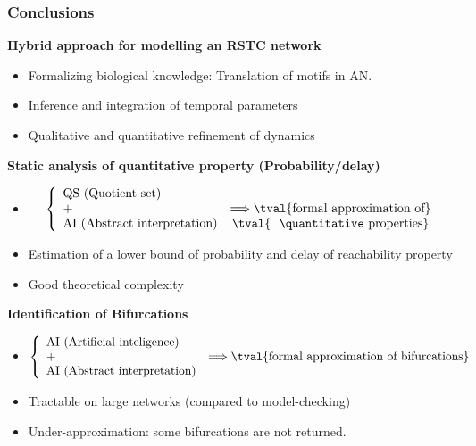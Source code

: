 \begin{frame}[c]
  \frametitle{Conclusions}



\textbf{Hybrid approach for modelling an RSTC network}
  \begin{itemize}
   \item Formalizing biological knowledge: Translation of motifs in AN.
   \item Inference and integration of temporal parameters
   \item Qualitative and quantitative refinement of dynamics 
  \end{itemize}

\textbf{Static analysis of quantitative property (Probability/delay)}
\begin{itemize}
 \item 
  $$
\left\{
    \begin{array}{lcl}
        \mbox{QS (Quotient set)} &\\  %
        \mbox{+} & \Longrightarrow \mbox{\tval{formal approximation of}} \\
        \mbox{AI (Abstract interpretation)} & \mbox{\tval{\ \ \quantitative properties}}
    \end{array}
\right.
$$ 
 \item Estimation of a lower bound of probability and delay of reachability property 
 \item Good theoretical complexity
\end{itemize}



\textbf{Identification of Bifurcations}
 \begin{itemize}
\item 
$$
\left\{
    \begin{array}{lcl}
        \mbox{AI (Artificial inteligence)} &\\  %
        \mbox{+} & \Longrightarrow \mbox{\tval{formal approximation of bifurcations}} \\
        \mbox{AI (Abstract interpretation)} &
    \end{array}
\right.
$$ 
   \item Tractable on large networks (compared to model-checking)
   \item Under-approximation: some bifurcations are not returned.
  \end{itemize}
\medskip

\end{frame}




